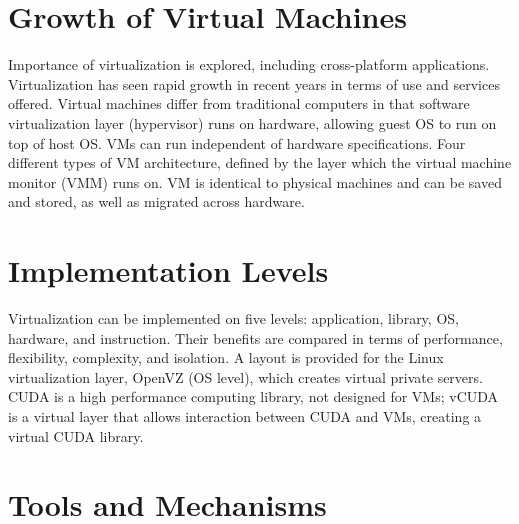 

\section{Growth of Virtual Machines}

Importance of virtualization is explored, including cross-platform
applications. Virtualization has seen rapid growth in recent years in
terms of use and services offered. Virtual machines differ from
traditional computers in that software virtualization layer (hypervisor)
runs on hardware, allowing guest OS to run on top of host OS. VMs can
run independent of hardware specifications. Four different types of VM
architecture, defined by the layer which the virtual machine monitor
(VMM) runs on. VM is identical to physical machines and can be saved and
stored, as well as migrated across hardware.



\section{Implementation Levels}

Virtualization can be implemented on five levels: application, library,
OS, hardware, and instruction. Their benefits are compared in terms of
performance, flexibility, complexity, and isolation. A layout is
provided for the Linux virtualization layer, OpenVZ (OS level), which
creates virtual private servers. CUDA is a high performance computing
library, not designed for VMs; vCUDA is a virtual layer that allows
interaction between CUDA and VMs, creating a virtual CUDA library.



\section{Tools and Mechanisms}

